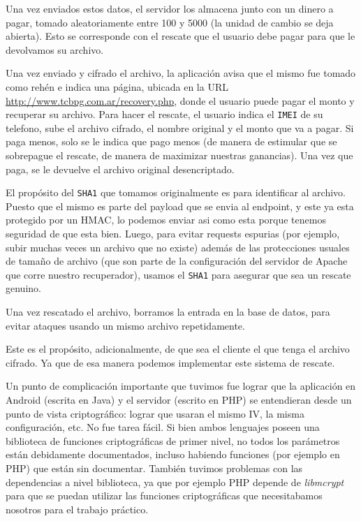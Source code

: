 Una vez enviados estos datos, el servidor los almacena junto con un dinero a pagar, tomado aleatoriamente entre 100 y 5000 (la unidad de cambio se deja abierta). Esto se corresponde con el rescate que el usuario debe pagar para que le devolvamos su archivo.

Una vez enviado y cifrado el archivo, la aplicación avisa que el mismo fue tomado como rehén e indica una página, ubicada en la URL
\url{http://www.tcbpg.com.ar/recovery.php}, donde el usuario puede pagar el monto y recuperar su archivo. Para hacer el rescate, el usuario
indica el \texttt{IMEI} de su telefono, sube el archivo cifrado, el nombre original y el monto que va a pagar. Si paga menos, solo se le indica que pago
menos (de manera de estimular que se sobrepague el rescate, de manera de maximizar nuestras ganancias). Una vez que paga, se le devuelve el
archivo original desencriptado.

El propósito del \texttt{SHA1} que tomamos originalmente es para identificar al archivo. Puesto que el mismo es parte del payload que se envia al
endpoint, y este ya esta protegido por un HMAC, lo podemos enviar asi como esta porque tenemos seguridad de que esta bien. Luego, para evitar
requests espurias (por ejemplo, subir muchas veces un archivo que no existe) además de las protecciones usuales de tamaño de archivo (que son parte de la configuración del servidor de Apache que corre nuestro recuperador), usamos el \texttt{SHA1} para asegurar que sea un rescate genuino.

Una vez rescatado el archivo, borramos la entrada en la base de datos, para evitar ataques usando un mismo archivo repetidamente.

Este es el propósito, adicionalmente, de que sea el cliente el que tenga el archivo cifrado. Ya que de esa manera podemos implementar este sistema de rescate.

Un punto de complicación importante que tuvimos fue lograr que la aplicación en Android (escrita en Java) y el servidor (escrito en PHP) se entendieran desde un punto de vista criptográfico: lograr que usaran el mismo IV, la misma configuración, etc. No fue tarea fácil. Si bien ambos lenguajes poseen una biblioteca de funciones criptográficas de primer nivel, no todos los parámetros están debidamente documentados, incluso habiendo funciones (por ejemplo en PHP) que están sin documentar. También tuvimos problemas con las dependencias a nivel biblioteca, ya que por ejemplo PHP depende de \textit{libmcrypt} para que se puedan utilizar las funciones criptográficas que necesitabamos nosotros para el trabajo práctico.


